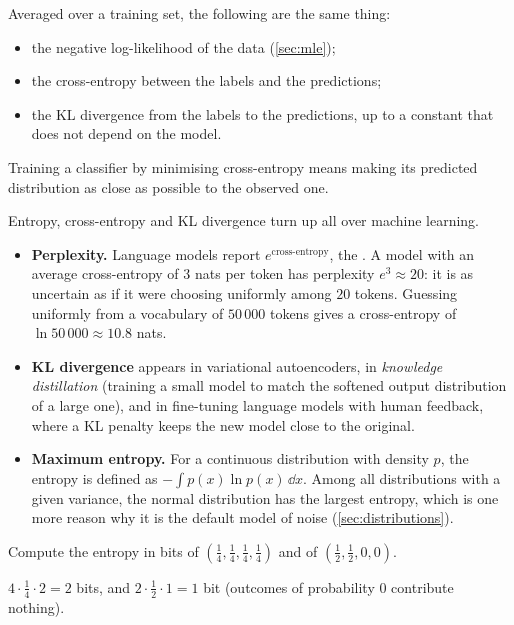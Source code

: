 \begin{keytakeaways}
Averaged over a training set, the following are the same thing:
\begin{itemize}
  \item the negative log-likelihood of the data (\cref{sec:mle});
  \item the cross-entropy between the labels and the predictions;
  \item the KL divergence from the labels to the predictions, up to a constant
    that does not depend on the model.
\end{itemize}
Training a classifier by minimising cross-entropy means making its predicted
distribution as close as possible to the observed one.
\end{keytakeaways}

\begin{mlnote}
Entropy, cross-entropy and KL divergence turn up all over machine learning.
\begin{itemize}
  \item \textbf{Perplexity.} Language models report $e^{\text{cross-entropy}}$,
    the . A model with an average cross-entropy of $3$ nats per
    token has perplexity $e^3 \approx 20$: it is as uncertain as if it were choosing
    uniformly among $20$ tokens. Guessing uniformly from a vocabulary of $50\,000$
    tokens gives a cross-entropy of $\ln50\,000 \approx 10.8$ nats.
  \item \textbf{KL divergence} appears in variational autoencoders, in
    \emph{knowledge distillation} (training a small model to match the softened
    output distribution of a large one), and in fine-tuning language models with
    human feedback, where a KL penalty keeps the new model close to the original.
  \item \textbf{Maximum entropy.} For a continuous distribution with density
    $p$, the entropy is defined as $-\int p(x)\ln p(x)\,\dd x$. Among all
    distributions with a given variance, the normal distribution has the largest
    entropy, which is one more reason why it is the default model of noise
    (\cref{sec:distributions}).
\end{itemize}
\end{mlnote}

\sectionexercises

\begin{exercise}
Compute the entropy in bits of $\left(\tfrac14, \tfrac14, \tfrac14, \tfrac14\right)$
and of $\left(\tfrac12, \tfrac12, 0, 0\right)$.
\end{exercise}
\begin{solution}
$4\cdot\tfrac14\cdot2 = 2$ bits, and $2\cdot\tfrac12\cdot1 = 1$ bit (outcomes of
probability $0$ contribute nothing).
\end{solution}

